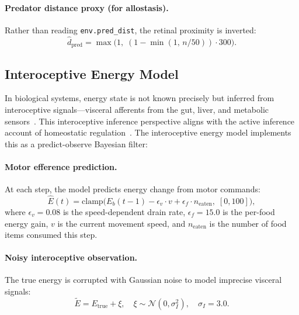 \documentclass[11pt,a4paper]{article}
\begin{document}
\paragraph{Predator distance proxy (for allostasis).}
Rather than reading \texttt{env.pred\_dist}, the retinal proximity is
inverted:
\begin{equation}\label{eq:pred_dist_proxy}
  \hat{d}_\text{pred} = \max\!\bigl(1,\;(1 - \min(1,\, n/50)) \cdot 300\bigr).
\end{equation}

\subsection{Interoceptive Energy Model}\label{sec:interoceptive}

In biological systems, energy state is not known precisely but inferred
from interoceptive signals---visceral afferents from the gut, liver, and
metabolic sensors~\cite{craig2002,seth2016,barrett2015,stephan2016}.
This interoceptive inference perspective aligns with the active inference
account of homeostatic regulation~\cite{pezzulo2015}.
The interoceptive energy model implements this as a predict-observe
Bayesian filter:

\paragraph{Motor efference prediction.}
At each step, the model predicts energy change from motor commands:
\begin{equation}\label{eq:energy_predict}
  \hat{E}(t) = \text{clamp}\!\bigl(E_b(t{-}1) - \epsilon_v \cdot v + \epsilon_f \cdot n_\text{eaten},\;[0,100]\bigr),
\end{equation}
where $\epsilon_v = 0.08$ is the speed-dependent drain rate,
$\epsilon_f = 15.0$ is the per-food energy gain,
$v$ is the current movement speed, and
$n_\text{eaten}$ is the number of food items consumed this step.

\paragraph{Noisy interoceptive observation.}
The true energy is corrupted with Gaussian noise to model imprecise
visceral signals:
\begin{equation}\label{eq:energy_observe}
  \tilde{E} = E_\text{true} + \xi, \quad \xi \sim \mathcal{N}(0, \sigma_I^2),
  \quad \sigma_I = 3.0.
\end{equation}
\end{document}

